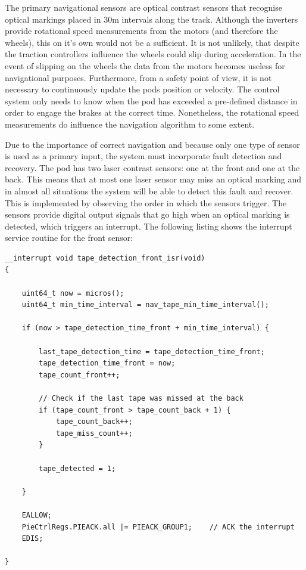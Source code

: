 The primary navigational sensors are optical contrast sensors that recognise optical markings placed in 30m intervals along the track. Although the inverters provide rotational speed measurements from the motors (and therefore the wheels), this on it's own would not be a sufficient. It is not unlikely, that despite the traction controllers influence the wheels could slip during acceleration. In the event of slipping on the wheels the data from the motors becomes useless for navigational purposes. Furthermore, from a safety point of view, it is not necessary to continuously update the pods position or velocity. The control system only needs to know when the pod has exceeded a pre-defined distance in order to engage the brakes at the correct time. Nonetheless, the rotational speed measurements do influence the navigation algorithm to some extent.

Due to the importance of correct navigation and because only one type of sensor is used as a primary input, the system must incorporate fault detection and recovery. The pod has two laser contrast sensors: one at the front and one at the back. This means that at most one laser sensor may miss an optical marking and in almost all situations the system will be able to detect this fault and recover. This is implemented by observing the order in which the sensors trigger. The sensors provide digital output signals that go high when an optical marking is detected, which triggers an interrupt. The following listing shows the interrupt service routine for the front sensor:

\begin{verbatim}
__interrupt void tape_detection_front_isr(void)
{

    uint64_t now = micros();
    uint64_t min_time_interval = nav_tape_min_time_interval();

    if (now > tape_detection_time_front + min_time_interval) {

        last_tape_detection_time = tape_detection_time_front;
        tape_detection_time_front = now;
        tape_count_front++;

        // Check if the last tape was missed at the back
        if (tape_count_front > tape_count_back + 1) {
            tape_count_back++;
            tape_miss_count++;
        }

        tape_detected = 1;

    }

    EALLOW;
    PieCtrlRegs.PIEACK.all |= PIEACK_GROUP1;    // ACK the interrupt
    EDIS;

}
\end{verbatim}

